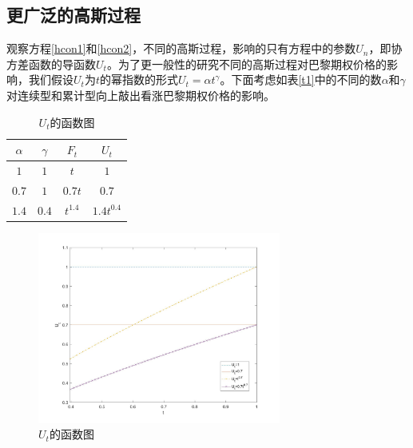 \documentclass{ctexart} %
\begin{document}
\subsection{更广泛的高斯过程}
观察方程\eqref{hcon1}和\eqref{hcon2}，不同的高斯过程，影响的只有方程中的参数$U_n$，即协方差函数的导函数$U_t$。为了更一般性的研究不同的高斯过程对巴黎期权价格的影响，我们假设$U_t$为$t$的幂指数的形式$U_t=\alpha t^\gamma$。下面考虑如表\ref{t1}中的不同的数$\alpha$和$\gamma$对连续型和累计型向上敲出看涨巴黎期权价格的影响。
\begin{table}[tbh!]
\begin{minipage}{0.48\textwidth}
\caption{算例使用的协方差函数}
\centering
\label{t1}
\begin{tabular}{c|c|c|c}
\hline
 $\alpha$&$\gamma$&$F_t$ & $U_t$ \\
\hline
$1$&$1$&$t$ & $1$ \\
$0.7$&$1$ & $0.7t$ & $0.7$ \\
$1.4$&$0.4$ & $t^{1.4}$ & $1.4t^{0.4}$ \\
\hline
\end{tabular}
\end{minipage}
\begin{minipage}{0.48\textwidth}
\centering
\begin{figure}[H]
\label{ut}
\centering
\includegraphics[width=8cm]{code/ut.jpg}
\caption{$U_t$的函数图}
\end{figure}
\end{minipage}
\end{table}
\iffalse
\end{document}
